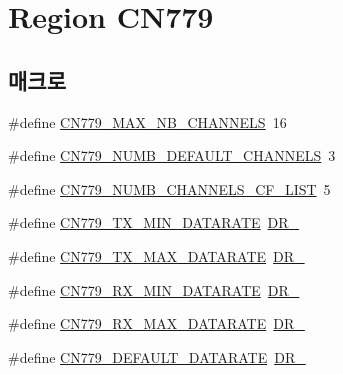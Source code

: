 \hypertarget{group___r_e_g_i_o_n_c_n779}{}\section{Region C\+N779}
\label{group___r_e_g_i_o_n_c_n779}
\subsection*{매크로}
\begin{DoxyCompactItemize}
\item 
\#define \mbox{\hyperlink{group___r_e_g_i_o_n_c_n779_gaa23230e648a8147840e88f03f9d3b7fc}{C\+N779\+\_\+\+M\+A\+X\+\_\+\+N\+B\+\_\+\+C\+H\+A\+N\+N\+E\+LS}}~16
\item 
\#define \mbox{\hyperlink{group___r_e_g_i_o_n_c_n779_ga03a2c79e3c0f039e5f1150e4d9fdfa1a}{C\+N779\+\_\+\+N\+U\+M\+B\+\_\+\+D\+E\+F\+A\+U\+L\+T\+\_\+\+C\+H\+A\+N\+N\+E\+LS}}~3
\item 
\#define \mbox{\hyperlink{group___r_e_g_i_o_n_c_n779_ga89f42e14e70be48170465e9cdd74caeb}{C\+N779\+\_\+\+N\+U\+M\+B\+\_\+\+C\+H\+A\+N\+N\+E\+L\+S\+\_\+\+C\+F\+\_\+\+L\+I\+ST}}~5
\item 
\#define \mbox{\hyperlink{group___r_e_g_i_o_n_c_n779_ga78e9e4ce4dd6df844573865d9de7e268}{C\+N779\+\_\+\+T\+X\+\_\+\+M\+I\+N\+\_\+\+D\+A\+T\+A\+R\+A\+TE}}~\mbox{\hyperlink{group___r_e_g_i_o_n_ga6c4ef966b4f3d5eb7597b087f2b97095}{D\+R\+\_}}
\item 
\#define \mbox{\hyperlink{group___r_e_g_i_o_n_c_n779_gabc1992b9207de536e7b92f2d51e6b7e4}{C\+N779\+\_\+\+T\+X\+\_\+\+M\+A\+X\+\_\+\+D\+A\+T\+A\+R\+A\+TE}}~\mbox{\hyperlink{group___r_e_g_i_o_n_ga3a06805baf4f00911a3a5d3dbadebf61}{D\+R\+\_}}
\item 
\#define \mbox{\hyperlink{group___r_e_g_i_o_n_c_n779_ga9b8a3086475f37d72484e75a4bf8f4a5}{C\+N779\+\_\+\+R\+X\+\_\+\+M\+I\+N\+\_\+\+D\+A\+T\+A\+R\+A\+TE}}~\mbox{\hyperlink{group___r_e_g_i_o_n_ga6c4ef966b4f3d5eb7597b087f2b97095}{D\+R\+\_}}
\item 
\#define \mbox{\hyperlink{group___r_e_g_i_o_n_c_n779_ga89261ba0eddf04555c7a38fff0dff2d6}{C\+N779\+\_\+\+R\+X\+\_\+\+M\+A\+X\+\_\+\+D\+A\+T\+A\+R\+A\+TE}}~\mbox{\hyperlink{group___r_e_g_i_o_n_ga3a06805baf4f00911a3a5d3dbadebf61}{D\+R\+\_}}
\item 
\#define \mbox{\hyperlink{group___r_e_g_i_o_n_c_n779_ga442dfac2a5611f9e14fb748376e99b3e}{C\+N779\+\_\+\+D\+E\+F\+A\+U\+L\+T\+\_\+\+D\+A\+T\+A\+R\+A\+TE}}~\mbox{\hyperlink{group___r_e_g_i_o_n_ga6c4ef966b4f3d5eb7597b087f2b97095}{D\+R\+\_}}

\end{DoxyCompactItemize}
